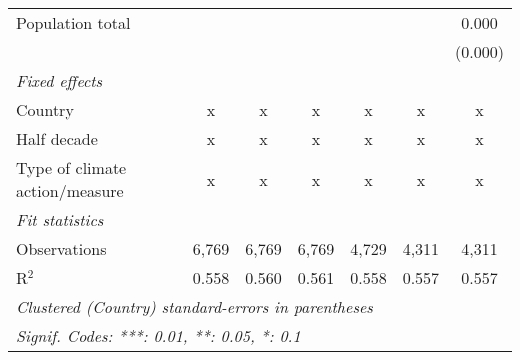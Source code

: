 \begin{tabular}{lcccccc}
   Population total                                     &               &                &                &                &                & 0.000\\   
                                                        &               &                &                &                &                & (0.000)\\   
   \emph{Fixed effects}\\
   Country                                              & x             & x              & x              & x              & x              & x\\  
   Half decade                                          & x             & x              & x              & x              & x              & x\\  
   Type of climate action/measure                       & x             & x              & x              & x              & x              & x\\  
   \midrule \emph{Fit statistics}\\
   Observations                                         & 6,769         & 6,769          & 6,769          & 4,729          & 4,311          & 4,311\\  
   R$^2$                                                & 0.558         & 0.560          & 0.561          & 0.558          & 0.557          & 0.557\\  
   \midrule
   \multicolumn{7}{l}{\emph{Clustered (Country) standard-errors in parentheses}}\\
   \multicolumn{7}{l}{\emph{Signif. Codes: ***: 0.01, **: 0.05, *: 0.1}}\\
\end{tabular}
\par\endgroup


